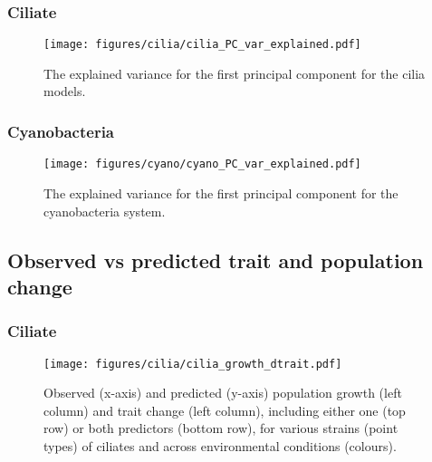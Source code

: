 \documentclass[
  letterpaper,
  DIV=11,
  numbers=noendperiod]{scrartcl}
\begin{document}
\subsubsection{Ciliate}\label{ciliate-3}

\begin{figure}

{\centering \texttt{[image: figures/cilia/cilia\_PC\_var\_explained.pdf]}

}

\caption{\label{fig-cilia_PC_var_explained}The explained variance for
the first principal component for the cilia models.}

\end{figure}

\subsubsection{Cyanobacteria}\label{cyanobacteria-3}

\begin{figure}

{\centering \texttt{[image: figures/cyano/cyano\_PC\_var\_explained.pdf]}

}

\caption{\label{fig-cyano_PC_var_explained}The explained variance for
the first principal component for the cyanobacteria system.}

\end{figure}

\subsection{Observed vs predicted trait and population
change}\label{observed-vs-predicted-trait-and-population-change}

\subsubsection{Ciliate}\label{ciliate-4}

\begin{figure}

{\centering \texttt{[image: figures/cilia/cilia\_growth\_dtrait.pdf]}

}

\caption{\label{fig-cilia_growth_dtrait}Observed (x-axis) and predicted
(y-axis) population growth (left column) and trait change (left column),
including either one (top row) or both predictors (bottom row), for
various strains (point types) of ciliates and across environmental
conditions (colours).}

\end{figure}
\end{document}
